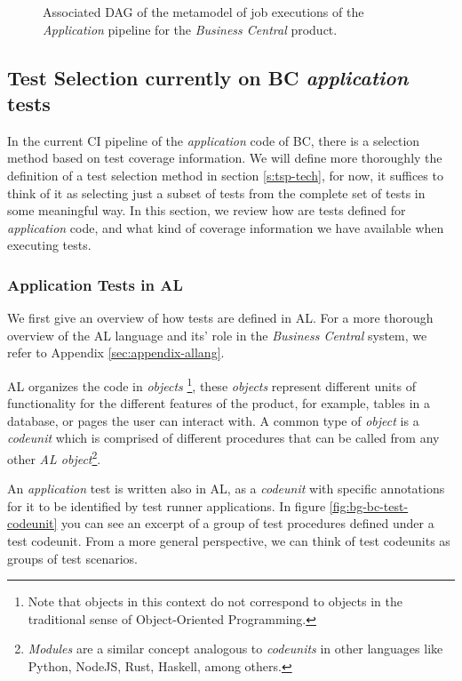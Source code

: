 \begin{figure}
    \centering
    \def\svgscale{0.1}
    
    \caption{Associated DAG of the metamodel of job executions of the \emph{Application} pipeline for the \emph{Business Central} product.}
    \label{fig:full-job-metamodel-dag}
\end{figure}

\subsection{Test Selection currently on BC \emph{application} tests}
\label{sec:bg-bc-test-selection-currently}

In the current CI pipeline of the \emph{application} code of BC, there is 
a selection method based on test coverage information. We will
define more thoroughly the definition of a test selection method in section \ref{s:tsp-tech},
for now, it suffices to think of it as selecting just a subset of tests from the complete
set of tests in some meaningful way. In this section, we review how are tests defined for \emph{application} code, and what kind
of coverage information we have available when executing tests.

\subsubsection{Application Tests in AL}\label{sec:app-tests-al}
We first give an overview of how tests are defined in AL.  For a more thorough overview of the AL
language and its' role in the \emph{Business Central} system, we refer to Appendix \ref{sec:appendix-allang}.

AL organizes the code in \emph{objects} \footnote{Note that objects in this context do not 
correspond to objects in the traditional sense of Object-Oriented Programming.}, these
\emph{objects} represent different units of functionality for the different features of the
product, for example, tables in a database, or pages the user can interact with. A common 
type of \emph{object} is a \emph{codeunit} which is comprised of different procedures that
can be called from any other \emph{AL object}\footnote{\emph{Modules} are a similar concept analogous
to \emph{codeunits} in other languages like Python, NodeJS, Rust, Haskell, among others.}.

An \emph{application} test is written also in AL, as a \emph{codeunit} with specific annotations for it to 
be identified by test runner applications. In figure \ref{fig:bg-bc-test-codeunit} you can see
an excerpt of a group of test procedures defined under a test codeunit. From a more general perspective, 
we can think of test codeunits as groups of test scenarios.

